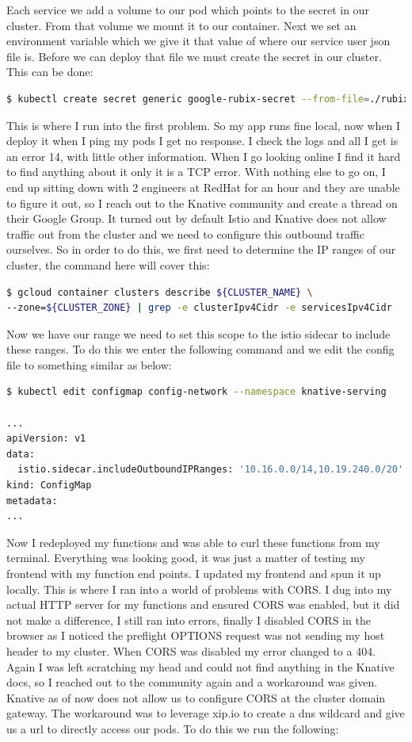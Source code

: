 Each service we add a volume to our pod which points to the secret in our cluster. From that volume we mount it to our container. Next we set an environment variable which we give it that value of where our service user json file is. Before we can deploy that file we must create the secret in our cluster. This can be done:
\begin{lstlisting}[language=bash]
$ kubectl create secret generic google-rubix-secret --from-file=./rubix.json
\end{lstlisting}
This is where I run into the first problem. So my app runs fine local, now when I deploy it when I ping my pods I get no response. I check the logs and all I get is an error 14, with little other information. When I go looking online I find it hard to find anything about it only it is a TCP error. With nothing else to go on, I end up sitting down with 2 engineers at RedHat for an hour and they are unable to figure it out, so I reach out to the Knative community and create a thread on their Google Group. It turned out by default Istio and Knative does not allow traffic out from the cluster and we need to configure this outbound traffic ourselves. So in order to do this, we first need to determine the IP ranges of our cluster, the command here will cover this:
\begin{lstlisting}[language=bash]
$ gcloud container clusters describe ${CLUSTER_NAME} \
--zone=${CLUSTER_ZONE} | grep -e clusterIpv4Cidr -e servicesIpv4Cidr
\end{lstlisting}
Now we have our range we need to set this scope to the istio sidecar to include these ranges. To do this we enter the following command and we edit the config file to something similar as below:
\begin{lstlisting}[language=bash]
$ kubectl edit configmap config-network --namespace knative-serving

...
apiVersion: v1
data:
  istio.sidecar.includeOutboundIPRanges: '10.16.0.0/14,10.19.240.0/20'
kind: ConfigMap
metadata:
...
\end{lstlisting}
Now I redeployed my functions and was able to curl these functions from my terminal. Everything was looking good, it was just a matter of testing my frontend with my function end points. I updated my frontend and spun it up locally. This is where I ran into a world of problems with CORS. I dug into my actual HTTP server for my functions and ensured CORS was enabled, but it did not make a difference, I still ran into errors, finally I disabled CORS in the browser as I noticed the preflight OPTIONS request was not sending my host header to my cluster. When CORS was disabled my error changed to a 404. Again I was left scratching my head and could not find anything in the Knative docs, so I reached out to the community again and a workaround was given. Knative as of now does not allow us to configure CORS at the cluster domain gateway. The workaround was to leverage xip.io to create a dns wildcard and give us a url to directly access our pods. To do this we run the following:
